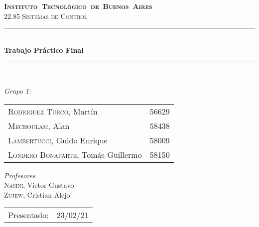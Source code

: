 \begin{titlepage}
\newcommand{\HRule}{\rule{\linewidth}{0.5mm}}
\center
\mbox{\textsc{\LARGE \bfseries {Instituto Tecnológico de Buenos Aires}}}\\[1.5cm]
\textsc{\Large 22.85 Sistemas de Control}\\[0.5cm]


\HRule \\[0.6cm]
{ \Huge \bfseries Trabajo Práctico Final}\\[0.4cm] 
\HRule \\[1.5cm]


{\large

\emph{Grupo 1:}\\
\vspace{3px}

\begin{tabular}{lr}
\textsc{Rodriguez Turco}, Martín  & 56629\\
\textsc{Mechoulam}, Alan & 58438\\ 	
\textsc{Lambertucci}, Guido Enrique  & 58009 \\
\textsc{Londero Bonaparte}, Tomás Guillermo  & 58150 \\
\end{tabular}

\vspace{20px}

\emph{Profesores}\\
\textsc{Nasini}, Victor Gustavo \\
\textsc{Zujew}, Cristian Alejo \\
\vspace{3px}

\vspace{100px}

\begin{tabular}{ll}

Presentado: & 23/02/21\\

\end{tabular}

}

\vfill

\end{titlepage}
